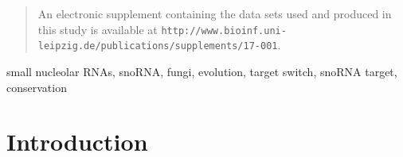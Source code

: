 \documentclass[preprint,3p,times,twocolumn]{elsarticle}
\newcommand{\url}[1]{\texttt{\small #1}}
\begin{document}
\begin{frontmatter}
\begin{abstract}
  
  An electronic supplement containing the data sets used and produced in
  this study is available at
  \url{http://www.bioinf.uni-leipzig.de/publications/supplements/17-001}. 
\end{abstract}

\begin{keyword}
  small nucleolar RNAs, snoRNA, fungi, evolution, target switch, snoRNA target, 	
  conservation	
\end{keyword}

\end{frontmatter}


\section{Introduction}
\end{document}
